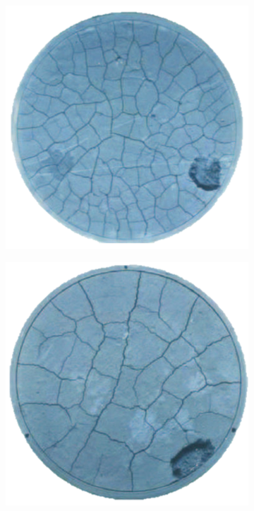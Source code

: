 
\begin{figure}[!htb]
    \centering
    \begin{subfigure}{0.31\textwidth}
        \includegraphics[width=\textwidth,scale=0.5]{past/figures/4mm_exp.png}
    \end{subfigure}
    \begin{subfigure}{0.31\textwidth}
        \includegraphics[width=\textwidth,scale=0.5]{past/figures/8mm_exp.png}

\end{subfigure}
\end{figure}
